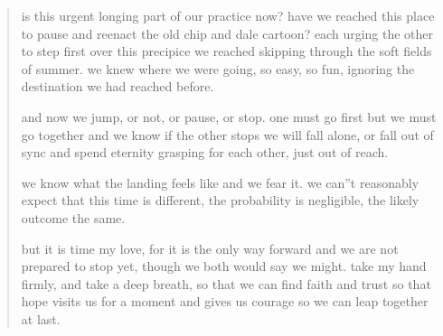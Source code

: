 

\begin{verse}
is this urgent longing part of our practice now?
have we reached this place to pause and
reenact the old chip and dale cartoon?
each urging the other to step first over
this precipice we reached skipping through
the soft fields of summer. we knew where 
we were going, so easy, so fun, ignoring
the destination we had reached before.

and now we jump, or not, or pause, or stop.
one must go first but we must go together
and we know if the other stops we will fall
alone, or fall out of sync and spend eternity
grasping for each other, just out of reach.

we know what the landing feels like and
we fear it. we can''t reasonably expect that
this time is different, the probability is 
negligible, the likely outcome the same. 

but it is time my love, for it is the only
way forward and we are not prepared to
stop yet, though we both would say we might.
take my hand firmly, and take a deep breath,
so that we can find faith and trust so
that hope visits us for a moment and
gives us courage so we can leap together at last.
\end{verse}
